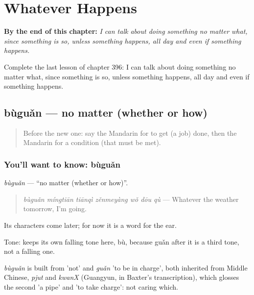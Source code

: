 
\chapter{Whatever Happens}
\label{ch:zh-whatever-happens}

\begin{chapteropening}
\textbf{By the end of this chapter:} \emph{I can talk about doing something no matter what, since something is so, unless something happens, all day and even if something happens.}

Complete the last lesson of chapter 396: I can talk about doing something no matter what, since something is so, unless something happens, all day and even if something happens.
\end{chapteropening}

\section[bùguǎn]{bùguǎn — no matter (whether or how)}

\label{lesson:ZH-C396-buguan}



\begin{quote}
Before the new one: say the Mandarin for to get (a job) done, then the Mandarin for a condition (that must be met).
\end{quote}

\subsection*{You'll want to know: bùguǎn}
\emph{bùguǎn} — \textquotedblleft{}no matter (whether or how)\textquotedblright{}.

\begin{quote}
\emph{bùguǎn míngtiān tiānqì zěnmeyàng wǒ dōu qù} — Whatever the weather tomorrow, I'm going.
\end{quote}

Its characters come later; for now it is a word for the ear.

Tone:  keeps its own falling tone here, bù, because guǎn after it is a third tone, not a falling one.

\begin{cousinweb}
\emph{bùguǎn} is built from  'not' and \emph{guǎn} 'to be in charge', both inherited from Middle Chinese, \emph{pjut} and \emph{kwanX} (Guangyun, in Baxter's transcription), which glosses the second 'a pipe' and 'to take charge': not caring which.
\end{cousinweb}

